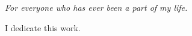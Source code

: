\begin{dedication}
\itshape             %
\raggedleft          %
For everyone who has ever been a part of my life.
\par   %
\vspace{2\baselineskip}
I dedicate this work.
\vspace{\baselineskip}
\par %
\end{dedication}